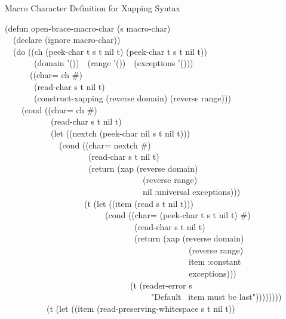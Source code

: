 \begin{table}
\begin{new}
\caption{Macro Character Definition for Xapping Syntax}
\label{XAPPING-MACRO-CHAR-TABLE}
\begin{lisp}
(defun open-brace-macro-char (s macro-char) \\
~~(declare (ignore macro-char)) \\
~~(do ((ch (peek-char t s t nil t) (peek-char t s t nil t)) \\
~~~~~~~(domain '())~~(range '())~~(exceptions '())) \\
~~~~~~((char= ch \#{\Xbackslash}{\Xrbrace}) \\
~~~~~~~(read-char s t nil t) \\
~~~~~~~(construct-xapping (reverse domain) (reverse range))) \\
~~~~(cond ((char= ch \#{\Xbackslash}{\Xarrowright}) \\
~~~~~~~~~~~(read-char s t nil t) \\
~~~~~~~~~~~(let ((nextch (peek-char nil s t nil t))) \\
~~~~~~~~~~~~~(cond ((char= nextch \#{\Xbackslash}{\Xrbrace}) \\
~~~~~~~~~~~~~~~~~~~~(read-char s t nil t) \\
~~~~~~~~~~~~~~~~~~~~(return (xap (reverse domain) \\
~~~~~~~~~~~~~~~~~~~~~~~~~~~~~~~~~(reverse range) \\
~~~~~~~~~~~~~~~~~~~~~~~~~~~~~~~~~nil :universal exceptions))) \\
~~~~~~~~~~~~~~~~~~~(t (let ((item (read s t nil t))) \\
~~~~~~~~~~~~~~~~~~~~~~~~(cond ((char= (peek-char t s t nil t) \#{\Xbackslash}{\Xrbrace}) \\
~~~~~~~~~~~~~~~~~~~~~~~~~~~~~~~(read-char s t nil t) \\
~~~~~~~~~~~~~~~~~~~~~~~~~~~~~~~(return (xap (reverse domain) \\
~~~~~~~~~~~~~~~~~~~~~~~~~~~~~~~~~~~~~~~~~~~~(reverse range) \\
~~~~~~~~~~~~~~~~~~~~~~~~~~~~~~~~~~~~~~~~~~~~item :constant \\
~~~~~~~~~~~~~~~~~~~~~~~~~~~~~~~~~~~~~~~~~~~~exceptions))) \\
~~~~~~~~~~~~~~~~~~~~~~~~~~~~~~(t (reader-error s \\
~~~~~~~~~~~~~~~~~~~~~~~~~~~~~~~~~~~"Default~{\Xarrowright} item must be last")))))))) \\
~~~~~~~~~~(t (let ((item (read-preserving-whitespace s t nil t)) \\

\end{lisp}
\end{new}
\end{table}
